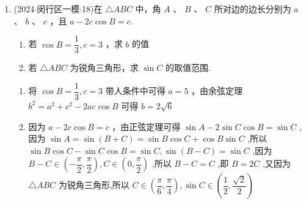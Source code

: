 \begin{enumerate}
    \item (2024$\cdot$闵行区一模$\cdot$18)在 $\bigtriangleup  {ABC}$ 中，角 $A$ 、 $B$ 、 $C$ 所对边的边长分别为 $a$ 、 $b$ 、 $c$ ，且 $a - {2c}\cos B = c$.
    \begin{enumerate}
        \item 若 $\cos B = \dfrac{1}{3},c = 3$ ，求 $b$ 的值
        \item 若 $\bigtriangleup  {ABC}$ 为锐角三角形，求 $\sin C$ 的取值范围.
    \end{enumerate}
    \begin{jieda}
        \begin{enumerate}
            \item 将 $\cos B = \dfrac{1}{3},c = 3$ 带人条件中可得 $a = 5$ ，由余弦定理 ${b}^{2} = {a}^{2} + {c}^{2} - {2ac}\cos B$ 可得 $b = 2\sqrt{6}$
            \item 因为 $a - {2c}\cos B = c$ ，由正弦定理可得 $\sin A - 2\sin C\cos B =  \sin C$ ,因为 $\sin A = \sin \left( {B + C}\right)  = \sin B\cos C + \cos B\sin C$ ,所以 $\sin B\cos C - \sin C\cos B = \sin C,\sin \left( {B - C}\right)  = \sin C$ ,因为 $B -  C \in  \left( {-\dfrac{\pi }{2},\dfrac{\pi }{2}}\right) ,C \in  \left( {0,\dfrac{\pi }{2}}\right)$ ,所以 $B - C = C$ ,即 $B = {2C}$ ,又因为 $\bigtriangleup {ABC}$ 为锐角三角形,所以 $C \in  \left( {\dfrac{\pi }{6},\dfrac{\pi }{4}}\right) ,\sin C \in  \left( {\dfrac{1}{2},\dfrac{\sqrt{2}}{2}}\right)$
        \end{enumerate}
    \end{jieda}


\end{enumerate}

